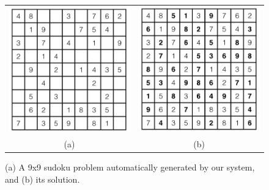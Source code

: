 \begin{figure}[!htpb]
\centering
\begin{tabular}{c c}
\includegraphics[scale=0.40]{puzzlefigs/sudoku_prob.png}
&
\includegraphics[scale=0.40]{puzzlefigs/sudoku_sol.png}
\\
(a) & (b)
\end{tabular}
\caption{(a) A 9x9 sudoku problem automatically generated by our system, and (b) its solution.}
\label{sudokuprobsol}
\end{figure}


